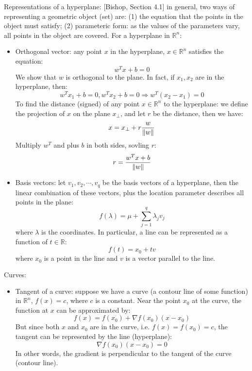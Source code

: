 \documentclass{report}
\begin{document}
Representations of a hyperplane: [Bishop, Section 4.1] in general, two ways of representing a geometric object (set) are: (1) the equation that the points in the object must satisfy; (2) parameteric form: as the values of the parameters vary, all points in the object are covered. For a hyperplane in $\mathbb{R}^n$: 
\begin{itemize}
\item Orthogonal vector: any point $x$ in the hyperplane, $x \in \mathbb{R}^n$ satisfies the equation: 
\begin{equation}
w^T x + b = 0	
\end{equation}
We show that $w$ is orthogonal to the plane. In fact, if $x_1, x_2$ are in the hyperplane, then:
\begin{equation}
w^T x_1 + b = 0, w^T x_2 + b = 0 \Rightarrow w^T (x_2 - x_1) = 0
\end{equation}
To find the distance (signed) of any point $x \in \mathbb{R}^n$ to the hyperplane: we define the projection of $x$ on the plane $x_{\bot}$, and let $r$ be the distance, then we have: 
\begin{equation}
x = x_{\bot} + r \frac{w}{\lVert w\rVert}	
\end{equation}
Multiply $w^T$ and plus $b$ in both sides, sovling $r$: 
\begin{equation}
r = \frac{w^T x + b}{\lVert w\rVert}	
\end{equation}
 
\item Basis vectors: let $v_1, v_2, \cdots, v_q$ be the basis vectors of a hyperplane, then the linear combination of these vectors, plus the location parameter describes all points in the plane: 
\begin{equation}
f(\lambda) = \mu + \sum_{j=1}^q \lambda_j v_j	
\end{equation}
where $\lambda$ is the coordinates. In particular, a line can be represented as a function of $t \in \mathbb{R}$: 
\begin{equation}
f(t) = x_0 + t v	
\end{equation}
where $x_0$ is a point in the line and $v$ is a vector parallel to the line. 
\end{itemize}

Curves: 
\begin{itemize}
\item Tangent of a curve: suppose we have a curve (a contour line of some function) in $\mathbb{R}^n$, $f(x) = c$, where $c$ is a constant. Near the point $x_0$ at the curve, the function at $x$ can be approximated by: 
\begin{equation}
f(x) = f(x_0) + \nabla f(x_0) (x - x_0)
\end{equation}
But since both $x$ and $x_0$ are in the curve, i.e. $f(x) = f(x_0) = c$, the tangent can be represented by the line (hyperplane): 
\begin{equation}
\nabla f(x_0) (x - x_0) = 0	
\end{equation}
In other words, the gradient is perpendicular to the tangent of the curve (contour line). 

\end{itemize}
\end{document}
